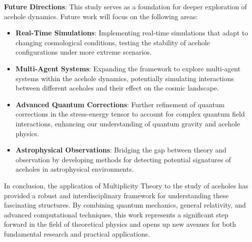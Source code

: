 \documentclass{article}
\theoremstyle{plain}
\begin{document}
\textbf{Future Directions}: This study serves as a foundation for deeper exploration of acehole dynamics. Future work will focus on the following areas:
\begin{itemize}
    \item \textbf{Real-Time Simulations}: Implementing real-time simulations that adapt to changing cosmological conditions, testing the stability of acehole configurations under more extreme scenarios.
    \item \textbf{Multi-Agent Systems}: Expanding the framework to explore multi-agent systems within the acehole dynamics, potentially simulating interactions between different aceholes and their effect on the cosmic landscape.
    \item \textbf{Advanced Quantum Corrections}: Further refinement of quantum corrections in the stress-energy tensor to account for complex quantum field interactions, enhancing our understanding of quantum gravity and acehole physics.
    \item \textbf{Astrophysical Observations}: Bridging the gap between theory and observation by developing methods for detecting potential signatures of aceholes in astrophysical environments.
\end{itemize}

In conclusion, the application of Multiplicity Theory to the study of aceholes has provided a robust and interdisciplinary framework for understanding these fascinating structures. By combining quantum mechanics, general relativity, and advanced computational techniques, this work represents a significant step forward in the field of theoretical physics and opens up new avenues for both fundamental research and practical applications.

\nocite{*}


\end{document}
